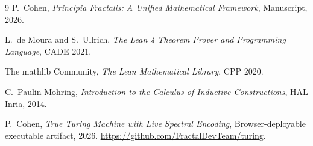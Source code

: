 \documentclass[11pt,a4paper]{article}
\theoremstyle{definition}
\begin{document}
\begin{thebibliography}{9}
P.~Cohen,
\emph{Principia Fractalis: A Unified Mathematical Framework},
Manuscript, 2026.

L.~de Moura and S.~Ullrich,
\emph{The Lean 4 Theorem Prover and Programming Language},
CADE 2021.

The mathlib Community,
\emph{The Lean Mathematical Library},
CPP 2020.

C.~Paulin-Mohring,
\emph{Introduction to the Calculus of Inductive Constructions},
HAL Inria, 2014.

P.~Cohen,
\emph{True Turing Machine with Live Spectral Encoding},
Browser-deployable executable artifact, 2026.
\url{https://github.com/FractalDevTeam/turing}.
\end{thebibliography}
\end{document}
